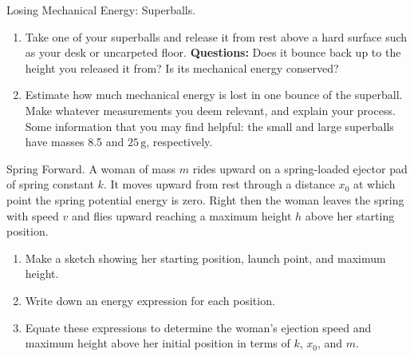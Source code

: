\begin{aproblem}{Losing Mechanical Energy: Superballs.}
  \begin{enumerate}
  \item Take one of your superballs and release it from rest above a
    hard surface such as your desk or uncarpeted floor.  {\bf
      Questions:} Does it bounce back up to the height you released it
    from?  Is its mechanical energy conserved?

  \item Estimate how much mechanical energy is lost in one bounce of
    the superball.  Make whatever measurements you deem relevant, and
    explain your process.  Some information that you may find helpful:
    the small and large superballs have masses 8.5 and $25\,
    \mbox{g}$, respectively.

  \end{enumerate}
\end{aproblem}



\begin{aproblem}{Spring Forward. } 
  A woman of mass $m$ rides upward on a spring-loaded ejector pad of
  spring constant $k$.  It moves upward from rest through a distance
  $x_0$ at which point the spring potential energy is zero.  Right
  then the woman leaves the spring with speed $v$ and flies upward
  reaching a maximum height $h$ above her starting position.
  \begin{enumerate}
  \item Make a sketch showing her starting position, launch point, and
    maximum height.

  \item Write down an energy expression for each position.

  \item Equate these expressions to determine the woman's ejection
    speed and maximum height above her initial position in terms of
    $k$, $x_0$, and $m$.
  \end{enumerate}
  \label{prob:spring_forward}
\end{aproblem}


